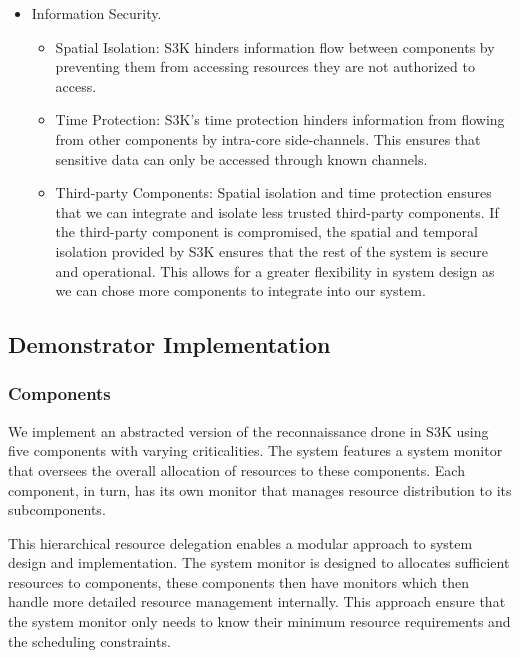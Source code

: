 \begin{itemize}
\begin{itemize}
		\end{itemize}
	\item Information Security.
		\begin{itemize}
			\item Spatial Isolation: 
				S3K hinders information flow between components by preventing them from accessing resources they are not authorized to access.
			\item Time Protection:
				S3K's time protection hinders information from flowing from other components by intra-core side-channels.
				This ensures that sensitive data can only be accessed through known channels.
			\item Third-party Components:
				Spatial isolation and time protection ensures that we can integrate and isolate less trusted third-party components.
				If the third-party component is compromised, the spatial and temporal isolation provided by S3K ensures that the rest of the system is secure and operational.
				This allows for a greater flexibility in system design as we can chose more components to integrate into our system.
		\end{itemize}
\end{itemize}

\subsection{Demonstrator Implementation}

\subsubsection{Components}

We implement an abstracted version of the reconnaissance drone in S3K using five components with varying criticalities. 
The system features a system monitor that oversees the overall allocation of resources to these components. 
Each component, in turn, has its own monitor that manages resource distribution to its subcomponents.

This hierarchical resource delegation enables a modular approach to system design and implementation. 
The system monitor is designed to allocates sufficient resources to components, these components then have monitors which then handle more detailed resource management internally. 
This approach ensure that the system monitor only needs to know their minimum resource requirements and the scheduling constraints.


